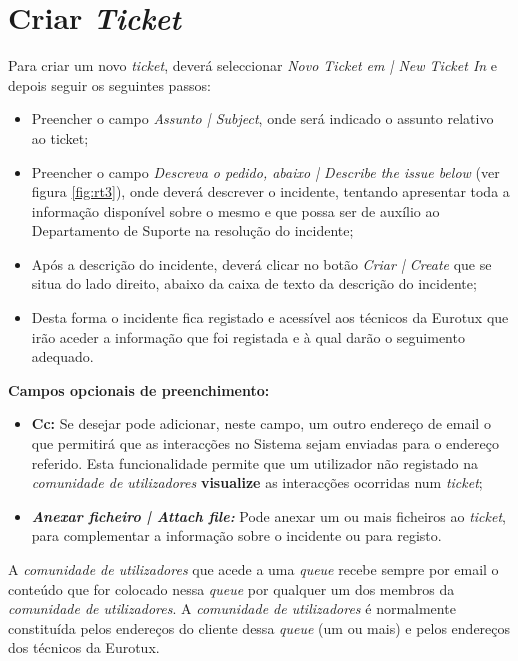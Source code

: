 \section{Criar \emph{Ticket}}
Para criar um novo \emph{ticket}, deverá seleccionar \emph{Novo Ticket em | New Ticket In} e depois seguir os seguintes passos:
\begin{itemize}
\item Preencher o campo \emph{Assunto | Subject}, onde será indicado o assunto relativo ao ticket;
\item Preencher o campo \emph{Descreva o pedido, abaixo | Describe the issue below} (ver figura \ref{fig:rt3}), onde deverá descrever o incidente, tentando apresentar toda a informação disponível sobre o mesmo e que possa ser de auxílio ao Departamento de Suporte na resolução do incidente;
\item Após a descrição do incidente, deverá clicar no botão \emph{Criar | Create} que se situa do lado direito, abaixo da caixa de texto da descrição do incidente;
\item Desta forma o incidente fica registado e acessível aos técnicos da Eurotux que irão aceder a informação que foi registada e à qual darão o seguimento adequado.
\end{itemize}

\bigskip

\textbf{Campos opcionais de preenchimento:}
\begin{itemize}
\item \textbf{Cc:}
\subitem Se desejar pode adicionar, neste campo, um outro endereço de email o que permitirá que as interacções no Sistema sejam enviadas para o endereço referido. Esta funcionalidade permite que um utilizador não registado na \textit{comunidade de utilizadores} \textbf{visualize} as interacções ocorridas num \emph{ticket};
\item \emph{\textbf{Anexar ficheiro | Attach file:}}
\subitem Pode anexar um ou mais ficheiros ao \emph{ticket}, para complementar a informação sobre o incidente ou para registo.
\end{itemize}

\bigskip

A \emph{comunidade de utilizadores} que acede a uma \emph{queue} recebe sempre por email o conteúdo que for colocado nessa \emph{queue} por qualquer um dos membros da \emph{comunidade de utilizadores}. A \emph{comunidade de utilizadores} é normalmente constituída pelos endereços do cliente dessa \emph{queue} (um ou mais) e pelos endereços dos técnicos da Eurotux.


